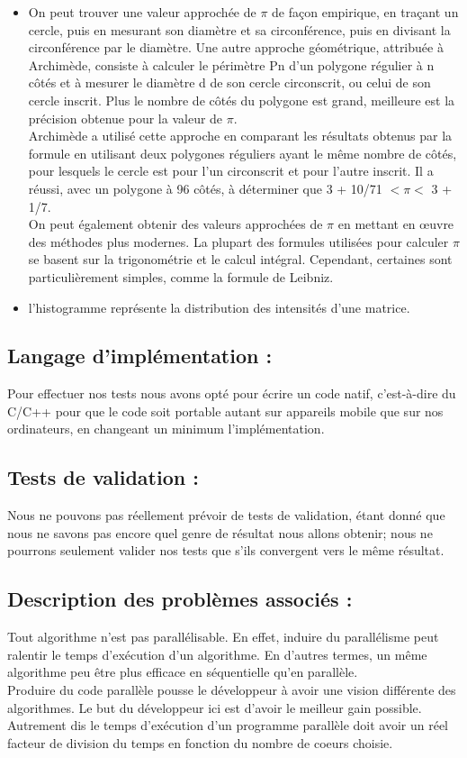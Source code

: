 \begin{itemize}
	\item  On peut trouver une valeur approchée de $\pi$\footnotemark[3]{} de façon empirique, en traçant un cercle, puis en mesurant son diamètre et sa circonférence, puis en divisant la circonférence par le diamètre. Une autre approche géométrique, attribuée à Archimède, consiste à calculer le périmètre Pn d’un polygone régulier à n côtés et à mesurer le diamètre d de son cercle circonscrit, ou celui de son cercle inscrit. Plus le nombre de côtés du polygone est grand, meilleure est la précision obtenue pour la valeur de $\pi$.\\
	Archimède a utilisé cette approche en comparant les résultats obtenus par la formule en utilisant deux polygones réguliers ayant le même nombre de côtés, pour lesquels le cercle est pour l’un circonscrit et pour l’autre inscrit. Il a réussi, avec un polygone à 96 côtés, à déterminer que 3 + 10/71 $< \pi <$ 3 + 1/7.\\
	On peut également obtenir des valeurs approchées de $\pi$ en mettant en œuvre des méthodes plus modernes. La plupart des formules utilisées pour calculer $\pi$ se basent sur la trigonométrie et le calcul intégral. Cependant, certaines sont particulièrement simples, comme la formule de Leibniz.\\

	\item l’histogramme représente la distribution des intensités d'une matrice.
	
\end{itemize}

	\subsection*{Langage d'implémentation :}
		Pour effectuer nos tests nous avons opté pour écrire un code natif, c'est-à-dire du C/C++ pour que le code soit portable autant sur appareils mobile que sur nos ordinateurs, en changeant un minimum l'implémentation. 

	\subsection*{Tests de validation :}
		Nous ne pouvons pas réellement prévoir de tests de validation, étant donné que nous ne savons pas encore quel genre de résultat nous allons obtenir; nous ne pourrons seulement valider nos tests que s'ils convergent vers le même résultat. 

	\subsection*{Description des problèmes associés :}
		Tout algorithme n'est pas parallélisable. En effet, induire du parallélisme peut ralentir le temps d'exécution d'un algorithme. En d'autres termes, un même algorithme peu être plus efficace en séquentielle qu'en parallèle.\\

		Produire du code parallèle pousse le développeur à avoir une vision différente des algorithmes. Le but du développeur ici est d'avoir le meilleur gain possible. Autrement dis le temps d'exécution d'un programme parallèle doit avoir un réel facteur de division du temps en fonction du nombre de coeurs choisie.
